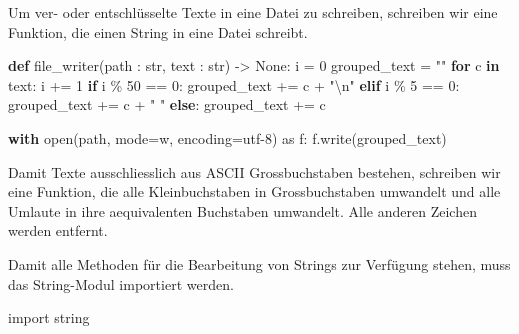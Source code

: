 \documentclass[
  nswissgerman,
  a4paper,
  DIV=11,
  numbers=noendperiod,
  ngerman]{scrreprt}
\newenvironment{Shaded}{\begin{snugshade}}{\end{snugshade}}
\newcommand{\BuiltInTok}[1]{\textcolor[rgb]{0.00,0.23,0.31}{#1}}
\newcommand{\CharTok}[1]{\textcolor[rgb]{0.13,0.47,0.30}{#1}}
\newcommand{\ControlFlowTok}[1]{\textcolor[rgb]{0.00,0.23,0.31}{\textbf{#1}}}
\newcommand{\DecValTok}[1]{\textcolor[rgb]{0.68,0.00,0.00}{#1}}
\newcommand{\ImportTok}[1]{\textcolor[rgb]{0.00,0.46,0.62}{#1}}
\newcommand{\KeywordTok}[1]{\textcolor[rgb]{0.00,0.23,0.31}{\textbf{#1}}}
\newcommand{\NormalTok}[1]{\textcolor[rgb]{0.00,0.23,0.31}{#1}}
\newcommand{\OperatorTok}[1]{\textcolor[rgb]{0.37,0.37,0.37}{#1}}
\newcommand{\StringTok}[1]{\textcolor[rgb]{0.13,0.47,0.30}{#1}}
\newcommand{\VariableTok}[1]{\textcolor[rgb]{0.07,0.07,0.07}{#1}}
\begin{document}
Um ver- oder entschlüsselte Texte in eine Datei zu schreiben, schreiben
wir eine Funktion, die einen String in eine Datei schreibt.

\begin{Shaded}
\begin{Highlighting}[numbers=left,,]
\KeywordTok{def}\NormalTok{ file\_writer(path : }\BuiltInTok{str}\NormalTok{, text : }\BuiltInTok{str}\NormalTok{) }\OperatorTok{{-}\textgreater{}} \VariableTok{None}\NormalTok{:}
\NormalTok{    i }\OperatorTok{=} \DecValTok{0}
\NormalTok{    grouped\_text }\OperatorTok{=} \StringTok{""}
    \ControlFlowTok{for}\NormalTok{ c }\KeywordTok{in}\NormalTok{ text:}
\NormalTok{        i }\OperatorTok{+=} \DecValTok{1}
        \ControlFlowTok{if}\NormalTok{ i }\OperatorTok{\%} \DecValTok{50} \OperatorTok{==} \DecValTok{0}\NormalTok{:}
\NormalTok{            grouped\_text }\OperatorTok{+=}\NormalTok{ c }\OperatorTok{+} \StringTok{"}\CharTok{\textbackslash{}n}\StringTok{"}
        \ControlFlowTok{elif}\NormalTok{ i }\OperatorTok{\%} \DecValTok{5} \OperatorTok{==} \DecValTok{0}\NormalTok{:}
\NormalTok{            grouped\_text }\OperatorTok{+=}\NormalTok{ c }\OperatorTok{+} \StringTok{" "}
        \ControlFlowTok{else}\NormalTok{:}
\NormalTok{            grouped\_text }\OperatorTok{+=}\NormalTok{ c}
        
    \ControlFlowTok{with} \BuiltInTok{open}\NormalTok{(path, mode}\OperatorTok{=}\StringTok{\textquotesingle{}w\textquotesingle{}}\NormalTok{, encoding}\OperatorTok{=}\StringTok{\textquotesingle{}utf{-}8\textquotesingle{}}\NormalTok{) }\ImportTok{as}\NormalTok{ f:}
\NormalTok{        f.write(grouped\_text)}
\end{Highlighting}
\end{Shaded}

Damit Texte ausschliesslich aus ASCII Grossbuchstaben bestehen,
schreiben wir eine Funktion, die alle Kleinbuchstaben in Grossbuchstaben
umwandelt und alle Umlaute in ihre aequivalenten Buchstaben umwandelt.
Alle anderen Zeichen werden entfernt.

Damit alle Methoden für die Bearbeitung von Strings zur Verfügung
stehen, muss das String-Modul importiert werden.

\begin{Shaded}
\begin{Highlighting}[numbers=left,,]
\ImportTok{import}\NormalTok{ string}
\end{Highlighting}
\end{Shaded}
\end{document}
